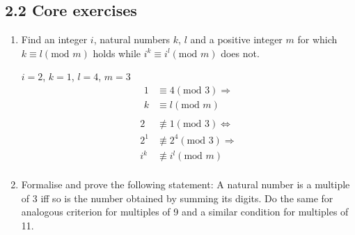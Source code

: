 \documentclass[10pt,\jkfside,a4paper]{article}
\begin{document}
\subsection*{2.2 Core exercises}

\begin{enumerate}

\item Find an integer $i$, natural numbers $k$, $l$ and a positive integer $m$ for which $k \equiv l (\text{mod } m)$ 
holds while $i^k \equiv i^l(\text{mod } m)$ does not.

\begin{center}
$i = 2$, $k = 1$, $l = 4$, $m = 3$
\begin{equation}
\begin{split}
1 &\equiv 4 (\text{mod } 3)\Longrightarrow\\
k &\equiv l (\text{mod } m)\\
\end{split}
\end{equation}
\begin{equation}
\begin{split}
2 &\not\equiv 1 (\text{mod } 3)\Longleftrightarrow\\
2^1 &\not\equiv 2^4 (\text{mod } 3)\Longrightarrow\\
i^k &\not\equiv i^l (\text{mod } m)\\
\end{split}
\end{equation}
\end{center}

\item Formalise and prove the following statement: A natural number is a multiple of 3 iff so is the number 
obtained by summing its digits. Do the same for analogous criterion for multiples of 9 and a similar condition 
for multiples of 11.


\end{enumerate}
\end{document}
